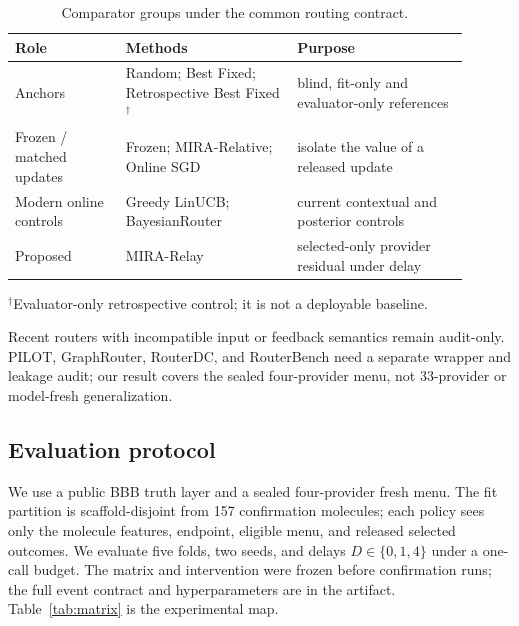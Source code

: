 \documentclass[sigconf,anonymous]{aamas}
\begin{document}
\begin{table}[t]
\caption{Comparator groups under the common routing contract.}
\label{tab:baselines}
\footnotesize
\begin{tabular}{@{}P{0.22\linewidth}P{0.34\linewidth}P{0.34\linewidth}@{}}
\toprule
Role & Methods & Purpose \\
\midrule
Anchors & Random; Best Fixed; Retrospective Best Fixed$^{\dagger}$ & blind, fit-only and evaluator-only references \\
Frozen / matched updates & Frozen; MIRA-Relative; Online SGD & isolate the value of a released update \\
Modern online controls & Greedy LinUCB; BayesianRouter & current contextual and posterior controls \\
Proposed & MIRA-Relay & selected-only provider residual under delay \\
\bottomrule
\end{tabular}
\begin{flushleft}
\footnotesize $^{\dagger}$Evaluator-only retrospective control; it is not a deployable baseline.
\end{flushleft}
\end{table}

Recent routers with incompatible input or feedback semantics remain audit-only. PILOT, GraphRouter, RouterDC, and RouterBench need a separate wrapper and leakage audit; our result covers the sealed four-provider menu, not 33-provider or model-fresh generalization.

\subsection{Evaluation protocol}
We use a public BBB truth layer and a sealed four-provider fresh menu. The fit partition is scaffold-disjoint from 157 confirmation molecules; each policy sees only the molecule features, endpoint, eligible menu, and released selected outcomes. We evaluate five folds, two seeds, and delays $D\in\{0,1,4\}$ under a one-call budget. The matrix and intervention were frozen before confirmation runs; the full event contract and hyperparameters are in the artifact. Table~\ref{tab:matrix} is the experimental map.
\end{document}
